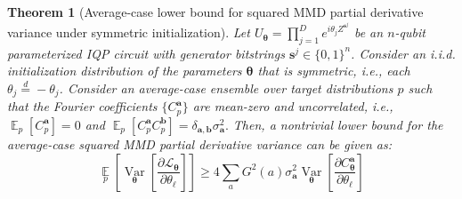 \documentclass[a4paper,onecolumn,notitlepage,nofootinbib,longbibliography,superscriptaddress, floatfix, pra, aps, 10pt]{revtex4-2}
\newcommand{\vttheta}{{\bm{\theta}}}
\newcommand{\vta}{{\bm{a}}}
\newcommand{\vtb}{{\bm{b}}}
\newcommand{\vtsj}{{\bm{s}^j}}
\newtheorem{theorem}{Theorem}
\begin{document}
\begin{theorem}[Average-case lower bound for squared MMD partial derivative variance under symmetric initialization]
\label{thm: average case symmetric}
Let $U_\vttheta = \prod_{j=1}^D e^{i \theta_j Z^\vtsj}$ be an $n$-qubit parameterized IQP circuit with generator
bitstrings $\vtsj \in \{0,1\}^n$. Consider an i.i.d. initialization distribution of the parameters $\vttheta$ that is symmetric, i.e., each $\theta_j \stackrel{d}{=} -\theta_j$.
Consider an average-case ensemble over target distributions $p$ such that the Fourier coefficients $\{C^\vta_p\}$ are mean-zero and uncorrelated, i.e.,
$\operatorname*{\mathbb{E}}_p \left[ C^\vta_p\right] = 0$ and $\operatorname*{\mathbb{E}}_p \left[ C^\vta_p C^\vtb_p\right] = \delta_{\vta,\vtb} \sigma_\vta^2.$
Then, a nontrivial lower bound for the average-case squared MMD partial derivative variance can be given as:
\begin{equation}
\operatorname*{\mathbb{E}}_p \left[\operatorname*{Var}_{\vttheta} \left[ \frac{\partial \mathcal{L}_\vttheta}{\partial \theta_\ell} \right]\right] \geq
4 \sum_aG^2(a)\sigma_\vta^2\operatorname*{Var}_{\vttheta} \left[ \frac{\partial C^\vta_\vttheta}{\partial \theta_\ell} \right] 
\end{equation}
\end{theorem}
\end{document}

